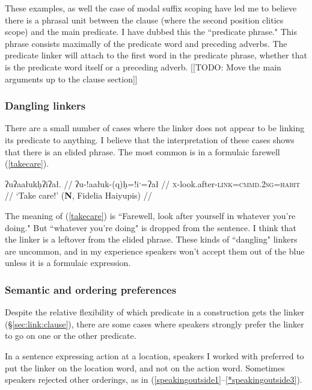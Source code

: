 
These examples, as well the case of modal suffix scoping have led me to believe there is a phrasal unit between the clause (where the second position clitics scope) and the main predicate. I have dubbed this the ``predicate phrase." This phrase consists maximally of the predicate word and preceding adverbs. The predicate linker will attach to the first word in the predicate phrase, whether that is the predicate word itself or a preceding adverb. [[TODO: Move the main arguments up to the clause section]]

\subsubsection{Dangling linkers} \label{sec:link:dangling}

There are a small number of cases where the linker does not appear to be linking its predicate to anything. I believe that the interpretation of these cases shows that there is an elided phrase. The most common is in a formulaic farewell (\ref{takecare}).

\ex \label{takecare}
\begingl
\glpreamble ʔuʔaałukḥʔiʔał. //
\gla ʔu-!aałuk-(q)ḥ=!iˑ=ʔał //
\glb \textsc{x}-look.after-\textsc{link}=\textsc{cmmd.2sg}=\textsc{habit} //
\glft `Take care!' (\textbf{N}, Fidelia Haiyupis) //
\endgl
\xe

The meaning of (\ref{takecare}) is ``Farewell, look after yourself in whatever you're doing." But ``whatever you're doing" is dropped from the sentence. I think that the linker is a leftover from the elided phrase. These kinds of ``dangling" linkers are uncommon, and in my experience speakers won't accept them out of the blue unless it is a formulaic expression.

\subsubsection{Semantic and ordering preferences} \label{sec:link:preferences}

Despite the relative flexibility of which predicate in a construction gets the linker (\S\ref{sec:link:clause}), there are some cases where speakers strongly prefer the linker to go on one or the other predicate.

In a sentence expressing action at a location, speakers I worked with preferred to put the linker on the location word, and not on the action word. Sometimes speakers rejected other orderings, as in (\ref{speakingoutside1}--\ref{*speakingoutside3}).

